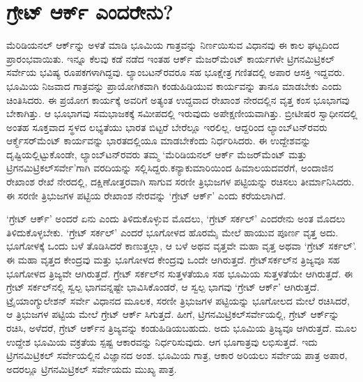 
\chapter{ಗ್ರೇಟ್​ ಆರ್ಕ್ ಎಂದರೇನು?}

ಮೆರಿಡಿಯನಲ್​ ಆರ್ಕ್‌ನ್ನು ಅಳತೆ ಮಾಡಿ ಭೂಮಿಯ ಗಾತ್ರವನ್ನು ನಿರ್ಣಯಿಸುವ ವಿಧಾನವು ಈ ಕಾಲ ಘಟ್ಟದಿಂದ ಪ್ರಾರಂಭವಾಯಿತು. ಇನ್ನೂ ಕೆಲವು ಕಡೆ ನಡೆದ ಇಂತಹ ಆರ್ಕ್ ಮೆಜರ್​ಮೆಂಟ್​ ಕಾರ್ಯಗಳೇ ಟ್ರಿಗನಮಿಟ್ರಿಕಲ್​ ಸರ್ವೇಯ ಭವಿಷ್ಯ ರೂಪಕಗಳಾಗಿದ್ದವು. ಲ್ಯಾಂಬಟನ್​ರವರೂ ಸಹ ಭೂಕ್ಷೇತ್ರ ಗಣಿತದಲ್ಲಿ ಅಪಾರ ಆಸಕ್ತಿ ಇದ್ದವರು. ಭೂಮಿಯ ನಿಜವಾದ ಗಾತ್ರವನ್ನು ಪ್ರಾಯೋಗಿಕವಾಗಿ ಕಂಡುಹಿಡಿಯುವ ಕಾರ್ಯವನ್ನು ತಾನೂ ಮಾಡಬೇಕು ಎಂದು ಚಿಂತಿಸಿದರು. ಈ ಪ್ರಯೋಗ ಕಾರ್ಯಕ್ಕೆ ಅವರಿಗೆ ಅತ್ಯಂತ ಉದ್ದವಾದ ರೇಖಾಂಶ ನೇರದಲ್ಲಿನ ವೃತ್ತ ಕಂಸ ಭೂಭಾಗವು ಬೇಕಾಗಿತ್ತು. ಆ ಭೂಭಾಗವು ಸಮಭಾಜಕಕ್ಕೆ ಸಮೀಪದಲ್ಲಿ ಇರುವುದು ಅಪೇಕ್ಷಣೀಯವಾಗಿತ್ತು. ಬ್ರೀಟೀಷರ ಸ್ವಾಧೀನದಲ್ಲಿ ಅಂತಹ ಸೂಕ್ತವಾದ ಸ್ಥಳದ ಲಭ್ಯತೆಯು ಭಾರತ ಬಿಟ್ಟರೆ ಬೇರೆಲ್ಲೂ ಇರಲಿಲ್ಲ. ಆದ್ದರಿಂದ ಲ್ಯಾಂಬ್​ಟನ್​ರವರು ಆರ್ಕ್\break ಮೆಸರ್​ಮೆಂಟ್​ ಕಾರ್ಯವನ್ನು ಭಾರತದಲ್ಲಿಯೂ ಮಾಡಬೇಕೆಂದು ನಿರ್ಧರಿಸಿದರು. ಈ ಉದ್ದೇಶವನ್ನು ದೃಷ್ಟಿಯಲ್ಲಿಟ್ಟುಕೊಂಡೇ, ಲ್ಯಾಂಬ್​ಟನ್​ರವರು ತಮ್ಮ ‘ಮೆರಿಡಿಯನಲ್​ ಆರ್ಕ್ ಮೆಜರ್​ಮೆಂಟ್​ ಮತ್ತು ಟ್ರಿಗನಮಿಟ್ರಿಕಲ್​ ಸರ್ವೇ’ಗಾಗಿ ವರದಿಯನ್ನು ಸಲ್ಲಿಸಿದ್ದರು.\break ಕನ್ಯಾಕುಮಾರಿಯಿಂದ ಹಿಮಾಲಯದವರೆಗೆ, ಅಂದಾಜಿನ  ರೇಖಾಂಶ ರೇಖೆ ನೇರದಲ್ಲಿ, ದಕ್ಷಿಣೋತ್ತರವಾಗಿ ಸಾಗುವ ಸರಣೀ ತ್ರಿಭುಜಗಳ ಪಟ್ಟಿಯನ್ನು ರಚಿಸಲು ತೀರ್ಮಾನಿಸಿದರು. ಈ ಸರಣೀ ತ್ರಿಭುಜಗಳ ಪಟ್ಟಿಯ ರೇಖಾಂಶ ನೇರವನ್ನು ‘ಗ್ರೇಟ್​ ಆರ್ಕ್’ ಎಂದು ಕರೆಯಲಾಗಿದೆ.

`ಗ್ರೇಟ್​ ಆರ್ಕ್’ ಅಂದರೆ ಏನು ಎಂದು ತಿಳಿದುಕೊಳ್ಳುವ ಮೊದಲು, ‘ಗ್ರೇಟ್​ ಸರ್ಕಲ್​’ ಎಂದರೇನು ಅಂತ ಮೊದಲು ತಿಳಿದುಕೊಳ್ಳಬೇಕು. ‘ಗ್ರೇಟ್​ ಸರ್ಕಲ್​’ ಎಂದರೆ ಭೂಗೋಳದ ಹೊರಮೈ ಮೇಲೆ ಹಾಯುವ ಪೂರ್ಣ ವೃತ್ತ ಅದು. ಭೂಗೋಳಕ್ಕೆ ಒಂದು ಬಳೆ ತೊಡಿಸಿದರೆ ಕಾಣುತ್ತಲ್ಲಾ, ಆ ಬಳೆ ಅಥವ ವೃತ್ತವೇ ಮಹಾ ವೃತ್ತ ಅಥವಾ ‘ಗ್ರೇಟ್​ ಸರ್ಕಲ್​’. ಈ ಮಹಾ ವೃತ್ತದ ಕೇಂದ್ರವು ಮತ್ತು ಭೂಗೋಳದ ಕೇಂದ್ರವು ಒಂದೇ ಆಗಿರುತ್ತದೆ. ಗ್ರೇಟ್​ ಸರ್ಕಲ್​ನ ತ್ರಿಜ್ಯವೂ ಸಹ ಭೂಗೋಳದ ತ್ರಿಜ್ಯವೇ ಆಗಿರುತ್ತದೆ. ಗ್ರೇಟ್​ ಸರ್ಕಲ್​ನ ಸುತ್ತಳತೆಯೂ ಸಹ ಭೂಮಿಯ ಸುತ್ತಳತೆಯೇ ಆಗಿರುತ್ತದೆ. ಈ ಗ್ರೇಟ್​ ಸರ್ಕಲ್​ನಲ್ಲಿ ಸ್ವಲ್ಪ ಭಾಗವನ್ನಷ್ಟೇ ಭಾವಿಸಿಕೊಂಡರೆ, ಆ ಸ್ವಲ್ಪ ಭಾಗವು ‘ಗ್ರೇಟ್​ ಆರ್ಕ್’ ಆಗಿರುತ್ತದೆ. ಟ್ರೈಯಾಂಗ್ಯುಲೇಶನ್​ ಸರ್ವೇ ವಿಧಾನದ ಮೂಲಕ, ಸರಣೀ ತ್ರಿಭುಜಗಳ ಪಟ್ಟಿಯನ್ನು ಭೂಗೋಲದ ಮೇಲೆ ರಚಿಸಿದರೆ, ಆ ತ್ರಿಭುಜಗಳ ಪಟ್ಟಿಯ ಮೇಲೆ ಗ್ರೇಟ್​ ಆರ್ಕ್ ಸಿಗುತ್ತದೆ. ಹೀಗೆ, ಟ್ರಿಗನಮಿಟ್ರಿಕಲ್​ ಸರ್ವೇಯಲ್ಲಿ, ಗ್ರೇಟ್​ ಆರ್ಕ್‌ನ್ನು ರಚಿಸಿ, ಅಳೆದರೆ, ಗ್ರೇಟ್​ ಆರ್ಕ್‌ನ ತ್ರಿಜ್ಯವನ್ನು ಕಂಡುಹಿಡಿಯಬಹುದು. ಅದು ಭೂಮಿಯ ತ್ರಿಜ್ಯವೂ ಆಗಿರುತ್ತದೆ. ಮೂಲ ಉದ್ದೇಶ ಭೂಮಿಯ ವಕ್ರತೆಯ ಸ್ಪಷ್ಟ ಆಕಾರವನ್ನು ನಿರ್ಧರಿಸುವುದು. ಆಗ ಭೂಗಾತ್ರವು ಲಭಿಸುತ್ತದೆ. ಇದು ಟ್ರಿಗನಮಿಟ್ರಿಕಲ್​ ಸರ್ವೇಯಲ್ಲಿನ ವಿಜ್ಞಾನದ ಅಂಶ. ಭೂಮಿಯ ಗಾತ್ರ, ಆಕಾರ ಅರಿಯಲು ಸರ್ವೇಯ ಪಾತ್ರ ಅಪಾರ, ಅದರಲ್ಲೂ ಟ್ರಿಗನಮಿಟ್ರಿಕಲ್​ ಸರ್ವೇಯದು ಮುಖ್ಯ ಪಾತ್ರ.

